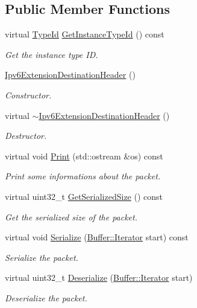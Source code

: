 \subsection*{Public Member Functions}
\begin{DoxyCompactItemize}
\item 
virtual \hyperlink{classns3_1_1TypeId}{Type\+Id} \hyperlink{classns3_1_1Ipv6ExtensionDestinationHeader_abfb43d18b3af06a36325f44ea9afff17}{Get\+Instance\+Type\+Id} () const 
\begin{DoxyCompactList}\small\item\em Get the instance type ID. \end{DoxyCompactList}\item 
\hyperlink{classns3_1_1Ipv6ExtensionDestinationHeader_a70c33b0a1aba02604916011f304934d1}{Ipv6\+Extension\+Destination\+Header} ()
\begin{DoxyCompactList}\small\item\em Constructor. \end{DoxyCompactList}\item 
virtual \hyperlink{classns3_1_1Ipv6ExtensionDestinationHeader_a5517073a6633955d9a63552d5056d890}{$\sim$\+Ipv6\+Extension\+Destination\+Header} ()
\begin{DoxyCompactList}\small\item\em Destructor. \end{DoxyCompactList}\item 
virtual void \hyperlink{classns3_1_1Ipv6ExtensionDestinationHeader_ab4c815a5dc737882e9be3b9d34e6c2ad}{Print} (std\+::ostream \&os) const 
\begin{DoxyCompactList}\small\item\em Print some informations about the packet. \end{DoxyCompactList}\item 
virtual uint32\+\_\+t \hyperlink{classns3_1_1Ipv6ExtensionDestinationHeader_a4a43146a75ea4259b984df145c573146}{Get\+Serialized\+Size} () const 
\begin{DoxyCompactList}\small\item\em Get the serialized size of the packet. \end{DoxyCompactList}\item 
virtual void \hyperlink{classns3_1_1Ipv6ExtensionDestinationHeader_a13d3b01676de81cbcdd3fcebaf2fdd6b}{Serialize} (\hyperlink{classns3_1_1Buffer_1_1Iterator}{Buffer\+::\+Iterator} start) const 
\begin{DoxyCompactList}\small\item\em Serialize the packet. \end{DoxyCompactList}\item 
virtual uint32\+\_\+t \hyperlink{classns3_1_1Ipv6ExtensionDestinationHeader_afb09b5d3221279bc1fcad100aa950947}{Deserialize} (\hyperlink{classns3_1_1Buffer_1_1Iterator}{Buffer\+::\+Iterator} start)
\begin{DoxyCompactList}\small\item\em Deserialize the packet. \end{DoxyCompactList}\end{DoxyCompactItemize}
